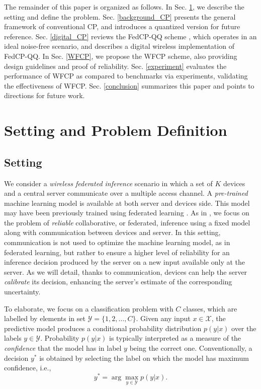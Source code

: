 \documentclass[12pt, draftclsnofoot, onecolumn]{IEEEtran}
\begin{document}
The remainder of this paper is organized as follows. In Sec. \ref{setting}, we describe the setting and define the problem. Sec. \ref{background_CP} presents the general framework of conventional CP, and introduces a quantized version for future reference. Sec. \ref{digital_CP} reviews the FedCP-QQ scheme \cite{FedCP-QQ}, which operates in an ideal noise-free scenario,  and describes a digital wireless implementation of FedCP-QQ. In Sec. \ref{WFCP}, we propose the WFCP scheme, also providing design guidelines and proof of reliability. Sec. \ref{experiment} evaluates the performance of WFCP as compared to benchmarks via experiments, validating the effectiveness of WFCP. Sec. \ref{conclusion} summarizes this paper and points to directions for future work.

\section{Setting and Problem Definition}\label{setting}
\subsection{Setting}
We consider a \emph{wireless federated inference} scenario in which a set of $K$ devices and a central server communicate over a multiple access channel. A \emph{pre-trained} machine learning model is available at both server and devices side. This model may have been previously trained using federated learning \cite{mcmahan2017communication}. As in \cite{FedCP-QQ}, we focus on the problem of \emph{reliable} collaborative, or federated, inference using a fixed model along with communication between devices and server. In this setting, communication is not used to optimize the machine learning model, as in federated learning, but rather to ensure a higher level of reliability for an inference decision produced by the server on a new input available only at the server. As we will detail, thanks to communication, devices can help the server \emph{calibrate} its decision, enhancing the server's estimate of the corresponding uncertainty.

To elaborate, we focus on a classification problem with $C$ classes, which are labelled by elements in set $\mathcal{Y}=\{1,2,\ldots,C\}$. Given any input $x\in\mathcal{X}$, the predictive model produces a conditional probability distribution $p(y|x)$ over the labels $y\in\mathcal{Y}$. Probability $p(y|x)$ is typically interpreted as a measure of the \emph{confidence} that the model has in label $y$ being the correct one. Conventionally, a decision $y^*$ is obtained by selecting the label on which the model has maximum confidence, i.e.,
\begin{equation}\label{point_prediction}
    y^*=\arg\max_{y\in\mathcal{Y}}p(y|x).
\end{equation} 
\end{document}
